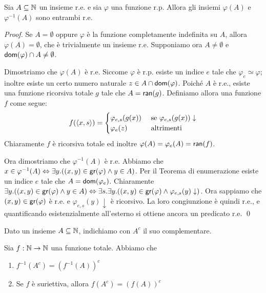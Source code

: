 \documentclass[runningheads,a4paper]{llncs}
\begin{document}
\begin{proposition}\label{prop:re-image}
Sia $A \subseteq \mathbb{N}$ un insieme r.e. e sia $\varphi$ una funzione r.p.
 Allora gli insiemi $\varphi(A)$ e $\varphi^{-1}(A)$ sono entrambi r.e.
\end{proposition}

\begin{proof}
Se $A = \emptyset$ oppure $\varphi$ \`{e} la funzione completamente indefinita su $A$, allora $\varphi(A) = \emptyset$, che \`{e}
 trivialmente un insieme r.e. Supponiamo ora $A \neq\emptyset$ e $\mathsf{dom}(\varphi) \cap A \neq \emptyset$.

 Dimostriamo che $\varphi(A)$ \`{e} r.e. Siccome $\varphi$ \`{e} r.p. esiste un indice $e$ tale che $\varphi_e \simeq \varphi$; inoltre esiste un 
 certo numero naturale $z \in A \cap \mathsf{dom}(\varphi)$. Poich\'{e} $A$ \`{e} r.e., esiste una funzione ricorsiva totale $g$ tale che $A= \mathsf{ran}(g)$.
 Definiamo allora una funzione $f$ come segue:
$$
f(\langle x,s \rangle) =
\begin{cases}
\varphi_{e,s}(g(x)) & \mbox{ se } \varphi_{e,s}(g(x))\downarrow \\
\varphi_e(z)     & \mbox{ altrimenti} \\ 
\end{cases}
$$
Chiaramente $f$ \`{e} ricorsiva totale ed inoltre $\varphi(A) = \varphi_e(A) = \mathsf{ran}(f)$.

Ora dimostriamo che $\varphi^{-1}(A)$ \`{e} r.e. 
 Abbiamo che $x \in \varphi^{-1}(A) \Leftrightarrow \exists y.((x,y) \in \mathsf{gr}(\varphi) \wedge y \in A)$.
 Per il Teorema di enumerazione esiste un indice $e$ tale che $A = \mathsf{dom}(\varphi_{e})$.
 Chiaramente 
 $\exists y.((x,y) \in \mathsf{gr}(\varphi) \wedge y \in A) \Leftrightarrow 
  \exists s.\exists y.((x,y) \in \mathsf{gr}(\varphi) \wedge \varphi_{e,s}(y)\downarrow)$.
Ora sappiamo che $(x,y) \in \mathsf{gr}(\varphi)$ \`{e} r.e. e $\varphi_{e,s}(y)\downarrow$ \`{e} ricorsivo.
 La loro congiunzione \`{e} quindi r.e., e quantificando esistenzialmente all'esterno si ottiene ancora un 
 predicato r.e.
\qed\end{proof}

Dato un insieme $A \subseteq \mathbb{N}$, indichiamo con $A^c$ il suo complementare.

\begin{remark}\label{rem:compl-im}
Sia $f:\mathbb{N} \to \mathbb{N}$ una funzione totale. Abbiamo che
\begin{enumerate}[label=(\roman*)]
\item $f^{-1}(A^c) = (f^{-1}(A))^c$
\item Se $f$ \`{e} suriettiva, allora $f(A^c) = (f(A))^c$
\end{enumerate}
\end{remark}
\end{document}
